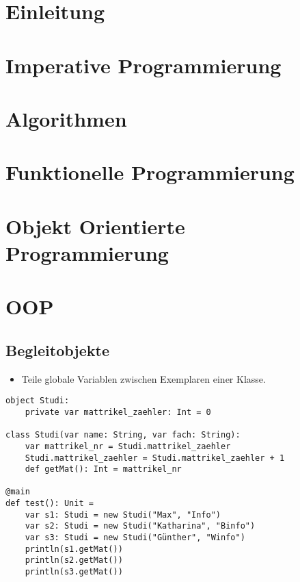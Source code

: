 \documentclass{article}
\begin{document}
\tableofcontents %
\newpage

\section{Einleitung}


\section{Imperative Programmierung}


\section{Algorithmen}


\section{Funktionelle Programmierung}


\section{Objekt Orientierte Programmierung}

\section{OOP}


\subsection{Begleitobjekte}
\begin{itemize}
	\item Teile globale Variablen zwischen Exemplaren einer Klasse.
\end{itemize}
\begin{verbatim}
object Studi:
	private var mattrikel_zaehler: Int = 0

class Studi(var name: String, var fach: String):
	var mattrikel_nr = Studi.mattrikel_zaehler
	Studi.mattrikel_zaehler = Studi.mattrikel_zaehler + 1
	def getMat(): Int = mattrikel_nr

@main
def test(): Unit = 
	var s1: Studi = new Studi("Max", "Info")
	var s2: Studi = new Studi("Katharina", "Binfo")
	var s3: Studi = new Studi("Günther", "Winfo")
	println(s1.getMat())
	println(s2.getMat())
	println(s3.getMat())
\end{verbatim}
\end{document}
